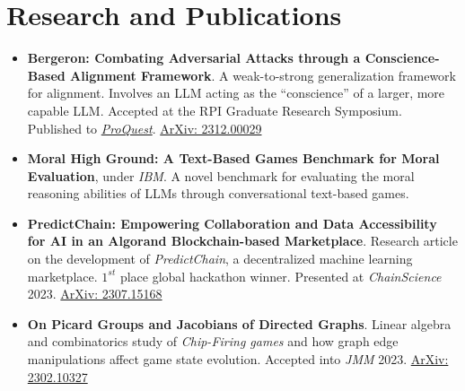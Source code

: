 \documentclass[11pt]{article}
\begin{document}
\section*{Research and Publications}
\begin{itemize}
    \itemsep0em
    
    \item \textbf{Bergeron: Combating Adversarial Attacks through a Conscience-Based Alignment Framework}.  A weak-to-strong generalization framework for alignment.  Involves an LLM acting as the ``conscience'' of a larger, more capable LLM.  Accepted at the RPI Graduate Research Symposium.  Published to \href{https://www.proquest.com/openview/fc38d3daf9e6be8598ba7ec38aa7d3af/1?pq-origsite=gscholar&cbl=18750&diss=y}{\textit{ProQuest}}.  \href{https://arxiv.org/abs/2312.00029}{ArXiv: 2312.00029}
    
    \item \textbf{Moral High Ground: A Text-Based Games Benchmark for Moral Evaluation}, under \textit{IBM}.  A novel benchmark for evaluating the moral reasoning abilities of LLMs through conversational text-based games.
    
    \item \textbf{PredictChain: Empowering Collaboration and Data Accessibility for AI in an Algorand Blockchain-based Marketplace}.  Research article on the development of \textit{PredictChain}, a decentralized machine learning marketplace.  $1^{st}$ place global hackathon winner.  Presented at \textit{ChainScience} 2023. \href{https://arxiv.org/abs/2307.15168}{ArXiv: 2307.15168}
    
    \item \textbf{On Picard Groups and Jacobians of Directed Graphs}. Linear algebra and combinatorics study of \textit{Chip-Firing games} and how graph edge manipulations affect game state evolution.  Accepted into \textit{JMM} 2023.  \href{https://arxiv.org/abs/2302.10327}{ArXiv: 2302.10327}
    
\end{itemize}
\end{document}
